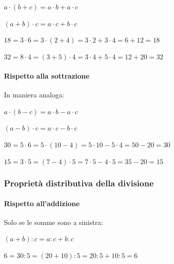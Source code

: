 \vspace{.5em}
\begin{minipage}{.38\textwidth}
 \(a \cdot (b+c) = a \cdot b + a \cdot c\)
 
 \((a+b) \cdot c = a \cdot c + b \cdot c\)
\end{minipage}
\hfill
\begin{minipage}{.58\textwidth}
 \(18 = 3 \cdot 6 = 3 \cdot(2+4) = 3 \cdot 2 + 3 \cdot 4 = 6 + 12 = 18\)
 
 \(32 = 8 \cdot 4 = (3+5) \cdot 4 = 3 \cdot 4 + 5 \cdot 4 = 12 + 20 = 32\)
\end{minipage}

\paragraph{Rispetto alla sottrazione}
In maniera analoga:


\vspace{.5em}
\begin{minipage}{.38\textwidth}
 \(a\cdot (b-c) = a\cdot b - a\cdot c\)
 
 \((a-b)\cdot c = a\cdot c - b\cdot c\)
\end{minipage}
\hfill
\begin{minipage}{.58\textwidth}
 \(30 = 5 \cdot 6 = 5\cdot(10-4) = 5\cdot 10 - 5\cdot 4 = 50 - 20 = 30\)
 
 \(15 = 3 \cdot 5 = (7-4) \cdot 5 = 7\cdot 5 - 4\cdot 5 = 35 - 20 = 15\)
\end{minipage}

\subsubsection{Proprietà distributiva della divisione}

\paragraph{Rispetto all'addizione}
Solo se le somme sono a sinistra:

\vspace{.5em}
\begin{minipage}{.38\textwidth}
 \((a+b): c=a:c+b:c\)
\end{minipage}
\hfill
\begin{minipage}{.58\textwidth}
 \(6 = 30 : 5 = (20+10):5=20:5+10:5=6\)
\end{minipage}

